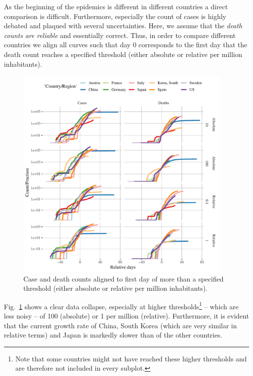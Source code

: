 \documentclass[a4paper]{tufte-handout}
\newcommand{\fig}[1]{Fig.~\ref{fig:#1}}
\begin{document}
As the beginning of the epidemics is different in different countries
a direct comparison is difficult. Furthermore, especially the count of
cases is highly debated and plaqued with several uncertainties. Here,
we assume that the {\em death counts are reliable} and essentially
correct. Thus, in order to compare different countries we align all
curves such that day $0$ corresponds to the first day that the death
count reaches a specified threshold (either absolute or relative per
million inhabitants).

\begin{figure}
  \begin{center}
    \includegraphics[width=0.95\textwidth]{../figs/align_data.pdf}
  \end{center}
  \caption{\label{fig:aligndata} Case and death counts aligned to
    first day of more than a specified threshold (either absolute or
    relative per million inhabitants).}
\end{figure}

\fig{aligndata} shows a clear data collapse, especially at higher
thresholds\footnote{Note that some countries might not have reached
  these higher thresholds and are therefore not included in every
  subplot.} -- which are less noisy -- of 100 (absolute) or 1 per
million (relative). Furthermore, it is evident that the current growth
rate of China, South Korea (which are very similar in relative terms)
and Japan is markedly slower than of the other countries.
\end{document}
